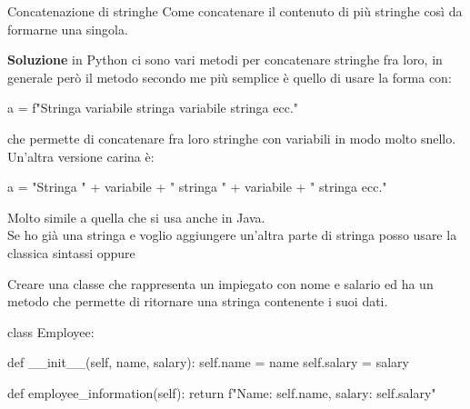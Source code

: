 \documentclass[10pt]{article}
\makeatletter
\newcommand{\<}{\langle}
\renewcommand{\>}{\rangle}
\renewenvironment{proof}[1][\proofname] {\par\pushQED{\qed}
\renewcommand*{\proofname}{Soluzione}
{\normalfont\sffamily\bfseries\topsep6\p@\@plus6\p@\relax #1\@addpunct{.} }}{\popQED\endtrivlist\@endpefalse}
\theoremstyle{mystyle}{\newtheorem*{remark}{Nota}}
\theoremstyle{mystyle}{\newtheorem*{remarks}{Note}}
\theoremstyle{mystyle}{\newtheorem*{example}{Esempio}}
\theoremstyle{mystyle}{\newtheorem*{examples}{Esempi}}
\theoremstyle{definition}{\newtheorem*{exercise}{Exercise}}
\theoremstyle{warn}
\makeatother
\begin{document}
\begin{definition}{Concatenazione di stringhe}{}
Come concatenare il contenuto di più stringhe così da formarne una singola.
\end{definition}
\begin{proof}
in Python ci sono vari metodi per concatenare stringhe fra loro, in generale però il metodo secondo me più semplice è quello di usare la forma con:
\begin{python}
a = f"Stringa {variabile} stringa {variabile} stringa ecc."
\end{python}
che permette di concatenare fra loro stringhe con variabili in modo molto snello.\\
Un'altra versione carina è:
\begin{python}
a = "Stringa " + variabile + " stringa " + variabile + " stringa ecc."
\end{python}
Molto simile a quella che si usa anche in Java.\\
Se ho già una stringa e voglio aggiungere un'altra parte di stringa posso usare la classica sintassi  oppure 
\end{proof}
\begin{example}
Creare una classe che rappresenta un impiegato con nome e salario ed ha un metodo che permette di ritornare una stringa contenente i suoi dati.
\begin{python}
class Employee:
    
    def __init__(self, name, salary):
        self.name = name
        self.salary = salary
    
    def employee_information(self):
        return f"Name: {self.name}, salary: {self.salary}"
\end{python}
\end{example}
\end{document}
